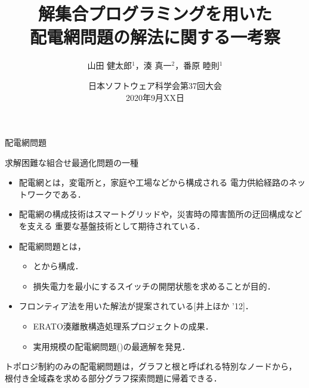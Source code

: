 \documentclass[dvipdfmx,11pt]{beamer}
\title{解集合プログラミングを用いた\\配電網問題の解法に関する一考察}
\author[山田 健太郎，湊 真一，番原 睦則]{山田 健太郎$^1$，湊 真一$^2$，番原 睦則$^1$}
\date{日本ソフトウェア科学会第37回大会\\2020年9月XX日}
\institute{1.名古屋大学 大学院情報学研究科 \\ 2.京都大学 大学院情報学研究科}
\begin{document}
\begin{frame}{}
  \titlepage
\end{frame}

\begin{frame}{配電網問題}
 \begin{alertblock}{}
  \centering
  求解困難な組合せ最適化問題の一種
 \end{alertblock}

 \begin{itemize}
  \item  \alert{配電網}とは，変電所と，家庭や工場などから構成される
		 電力供給経路のネットワークである．
  \item  配電網の構成技術はスマートグリッドや，災害時の障害箇所の迂回構成などを支える
		 重要な基盤技術として期待されている．
  \item  \alert{配電網問題}とは，
		 \begin{itemize}
		  \item {}とから構成．
		  \item 損失電力を最小にするスイッチの開閉状態を求めることが目的．
		 \end{itemize}
  \item フロンティア法を用いた解法が提案されている[井上ほか '12]． 
		\begin{itemize}
		 \item ERATO湊離散構造処理系プロジェクトの成果．
		 \item 実用規模の配電網問題()の最適解を発見．
		\end{itemize}
 \end{itemize}

 \vspace{-0.25cm}
 \pause
 \begin{alertblock}{}
  トポロジ制約のみの配電網問題は，グラフと根と呼ばれる特別なノードから，
  \alert{根付き全域森}を求める部分グラフ探索問題に帰着できる．
 \end{alertblock}
  
\end{frame}
\end{document}
